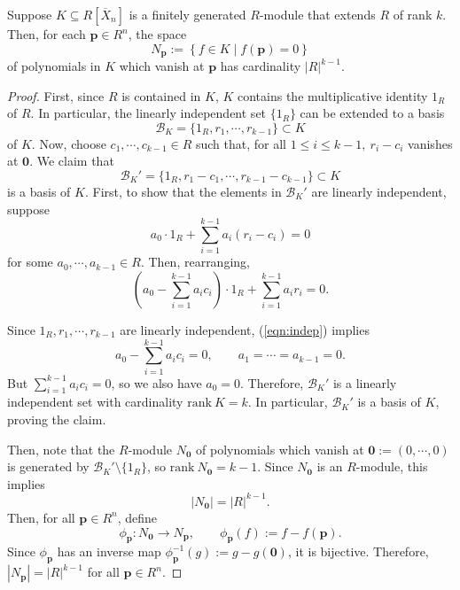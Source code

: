\documentclass[10pt,a4paper]{amsart}
\newcommand{\bp}{\mathbf{p} }
\begin{document}
\begin{lemma}\label{lem: Np}
Suppose $K \subseteq  R[\overline{X}_n]$ is a finitely generated $R$-module that extends $R$ of rank $k$. Then, for each $\bp \in R^n$, the space
\[
N_\bp := \left\{ f \in K \mid f(\bp) = 0 \right\}
\]
of polynomials in $K$ which vanish at $\bp$ has cardinality $|R|^{k - 1}$. 
\end{lemma}

\begin{proof}
First, since $R$ is contained in $K$, $K$ contains the multiplicative identity $1_R$ of $R$. In particular, the linearly independent set $\{1_R\}$ can be extended to a basis
\[
\mathcal{B}_K = \{ 1_R, r_1, \cdots , r_{k-1} \} \subset K
\]
of $K$. Now, choose $c_1, \cdots , c_{k-1} \in R$ such that, for all $1 \le i \le k-1, \ r_i - c_i$ vanishes at $\mathbf{0}$. We claim that
\[
\mathcal{B}_K' = \{ 1_R, r_1-c_1, \cdots , r_{k-1}-c_{k-1} \} \subset K
\]
is a basis of $K$. First, to show that the elements in $\mathcal{B}_K'$ are linearly independent, suppose 
\[
a_0 \cdot 1_R + \sum_{i=1}^{k-1}a_i(r_i - c_i) = 0
\]
for some $a_0, \cdots , a_{k-1} \in R$. Then, rearranging,
\begin{equation}\label{eqn:indep}
\left( a_0 -\sum_{i=1}^{k-1}a_ic_i \right) \cdot 1_R + \sum_{i=1}^{k-1}a_ir_i = 0.
\end{equation}

Since $1_R, r_1, \cdots, r_{k-1}$ are linearly independent, (\ref{eqn:indep}) implies
\[
a_0 -\sum_{i=1}^{k-1}a_ic_i = 0, \qquad a_1= \cdots = a_{k-1} = 0.
\]
But $\sum_{i=1}^{k-1}a_ic_i = 0$, so we also have $a_0 = 0$. Therefore, $\mathcal{B}_K'$ is a linearly independent set with cardinality $\mathrm{rank} \ K = k$. In particular, $\mathcal{B}_K'$ is a basis of $K$, proving the claim.

Then, note that the $R$-module $N_{\mathbf{0}}$ of polynomials which vanish at $\mathbf{0} := (0, \cdots , 0)$ is generated by $\mathcal{B}_K' \setminus \{1_R \}$, so $\mathrm{rank} \ N_{\mathbf{0}} = k-1$. Since $N_{\mathbf{0}}$ is an $R$-module, this implies
\[
|N_{\mathbf{0}}| = |R|^{k-1}.
\]
Then, for all $\bp \in R^n$, define 
\[
\phi_\bp: N_{\mathbf{0}} \to N_\bp, \qquad \phi_\bp(f) := f - f(\bp).
\]
Since $\phi_\bp$ has an inverse map
$\phi^{-1}_\bp(g) := g - g(\mathbf{0})$, it is bijective. Therefore, $|N_\bp| = |R|^{k - 1}$ for all $\bp \in R^n$.
\end{proof}
\end{document}
